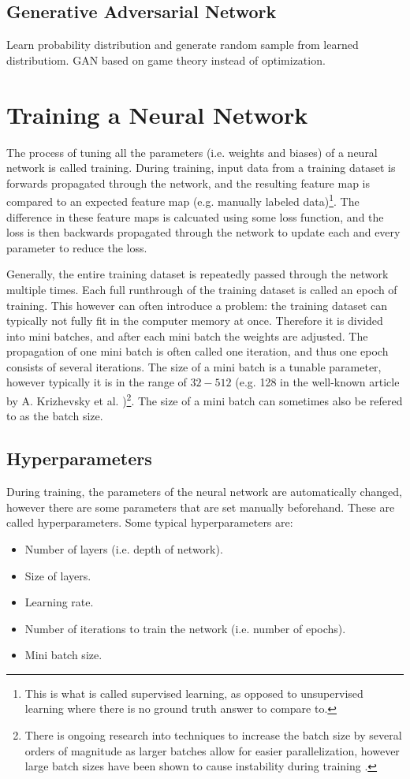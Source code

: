 \subsection{Generative Adversarial Network}
Learn probability distribution and generate random sample from learned distributiom. 
GAN based on game theory instead of optimization. 

\section{Training a Neural Network}
The process of tuning all the parameters (i.e. weights and biases) of a neural network is called training. During training, input data from a training dataset is forwards propagated through the network, and the resulting feature map is compared to an expected feature map (e.g. manually labeled data)\footnote{This is what is called supervised learning, as opposed to unsupervised learning where there is no ground truth answer to compare to. }. The difference in these feature maps is calcuated using some loss function, and the loss is then backwards propagated through the network to update each and every parameter to reduce the loss. 

Generally, the entire training dataset is repeatedly passed through the network multiple times. Each full runthrough of the training dataset is called an epoch of training. This however can often introduce a problem: the training dataset can typically not fully fit in the computer memory at once. Therefore it is divided into mini batches, and after each mini batch the weights are adjusted. The propagation of one mini batch is often called one iteration, and thus one epoch consists of several iterations. The size of a mini batch is a tunable parameter, however typically it is in the range of $32-512$ (e.g. 128 in the well-known article by A. Krizhevsky et al. \cite{alexnet})\footnote{There is ongoing research into techniques to increase the batch size by several orders of magnitude as larger batches allow for easier parallelization, however large batch sizes have been shown to cause instability during training \cite{you2017large}. }. The size of a mini batch can sometimes also be refered to as the batch size. 

\subsection{Hyperparameters}
During training, the parameters of the neural network are automatically changed, however there are some parameters that are set manually beforehand. These are called hyperparameters. Some typical hyperparameters are:
\begin{itemize}
    \item Number of layers (i.e. depth of network).
    \item Size of layers.
    \item Learning rate.
    \item Number of iterations to train the network (i.e. number of epochs).
    \item Mini batch size.
\end{itemize}

